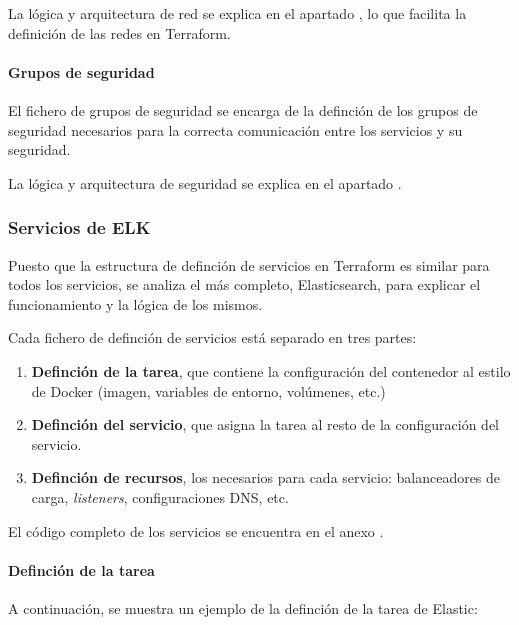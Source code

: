 La lógica y arquitectura de red se explica en el apartado
, lo que facilita la definición de las redes en Terraform.


\paragraph{Grupos de seguridad}
El fichero de grupos de seguridad  se encarga
de la definción de los grupos de seguridad necesarios para la correcta
comunicación entre los servicios y su seguridad.

La lógica y arquitectura de seguridad se explica en el apartado
.


\newpage{}
\subsubsection{Servicios de ELK}
Puesto que la estructura de definción de servicios en Terraform es similar para
todos los servicios, se analiza el más completo, Elasticsearch, para explicar el
funcionamiento y la lógica de los mismos.

Cada fichero de definción de servicios está separado en tres partes:
\begin{enumerate}
	\item \textbf{Definción de la tarea}, que contiene la configuración del
		contenedor al estilo de Docker (imagen, variables de entorno, volúmenes,
		etc.)
	\item \textbf{Definción del servicio}, que asigna la tarea al resto de la
		configuración del servicio.
	\item \textbf{Definción de recursos}, los necesarios para cada servicio:
		balanceadores de carga, \textit{listeners}, configuraciones DNS, etc.
\end{enumerate}

El código completo de los servicios se encuentra en el anexo .

\paragraph{Definción de la tarea}
A continuación, se muestra un ejemplo de la definción de la tarea de Elastic:

